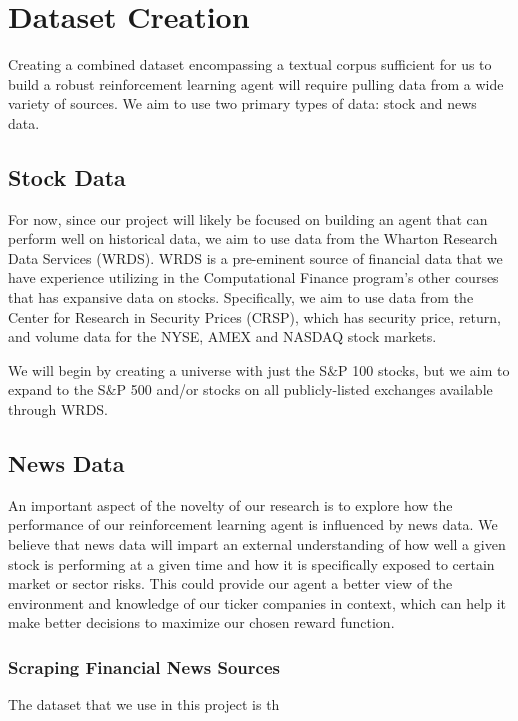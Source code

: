\section{Dataset Creation}

Creating a combined dataset encompassing a textual corpus sufficient for us to build 
a robust reinforcement learning agent will require pulling data from a wide variety 
of sources. We aim to use two primary types of data: stock and news data.

\subsection{Stock Data}

For now, since our project will likely be focused on building an agent that can perform 
well on historical data, we aim to use data from the Wharton Research Data Services 
(WRDS). WRDS is a pre-eminent source of financial data that we have experience 
utilizing in the Computational Finance program’s other courses that has expansive 
data on stocks. Specifically, we aim to use data from the Center for Research in 
Security Prices (CRSP), which has security price, return, and volume data for the 
NYSE, AMEX and NASDAQ stock markets. 

We will begin by creating a universe with just the S$\&$P 100 stocks, but we aim to 
expand to the S$\&$P 500 and/or stocks on all publicly-listed exchanges available through WRDS.

\subsection{News Data}

An important aspect of the novelty of our research is to explore how the performance 
of our reinforcement learning agent is influenced by news data.
We believe that news data will impart an external understanding of how 
well a given stock is performing at a given time and how it is specifically 
exposed to certain market or sector risks. This could provide our agent a better 
view of the environment and knowledge of our ticker companies in context, which 
can help it make better decisions to maximize our chosen reward function. 


\subsubsection{Scraping Financial News Sources}

The dataset that we use in this project is th

